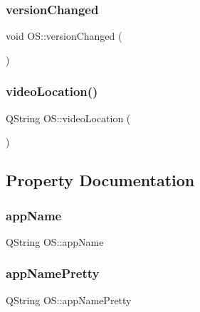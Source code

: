 \subsubsection{\texorpdfstring{versionChanged}{versionChanged}}
{\footnotesize\ttfamily void O\+S\+::version\+Changed (\begin{DoxyParamCaption}{ }\end{DoxyParamCaption})\hspace{0.3cm}{\ttfamily [signal]}}

\mbox{\label{classOS_afdfd88fe0b70d4ed51508e7dc364b1d4}} 
\subsubsection{\texorpdfstring{videoLocation()}{videoLocation()}}
{\footnotesize\ttfamily Q\+String O\+S\+::video\+Location (\begin{DoxyParamCaption}{ }\end{DoxyParamCaption})}



\subsection{Property Documentation}
\mbox{\label{classOS_af9d6295c5361884c9c7c25b13db70720}} 
\subsubsection{\texorpdfstring{appName}{appName}}
{\footnotesize\ttfamily Q\+String O\+S\+::app\+Name\hspace{0.3cm}{\ttfamily [read]}}

\mbox{\label{classOS_a5ecf65ef8f4ac491323d1590c2cb4e67}} 
\subsubsection{\texorpdfstring{appNamePretty}{appNamePretty}}
{\footnotesize\ttfamily Q\+String O\+S\+::app\+Name\+Pretty\hspace{0.3cm}{\ttfamily [read]}}

\mbox{\label{classOS_a8162949b8a268b409967ae356947e059}} 
